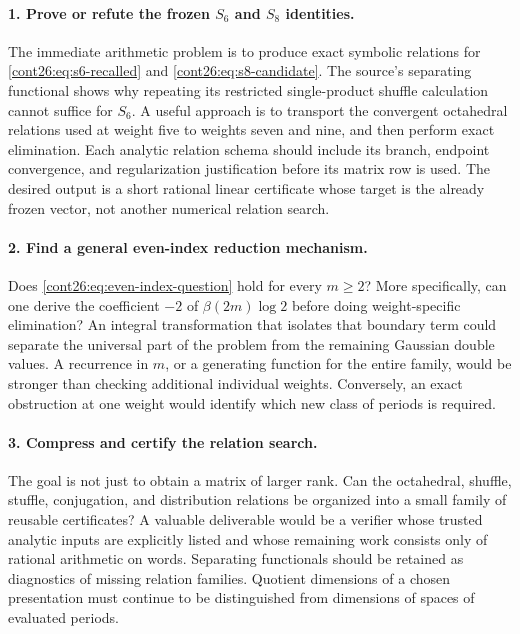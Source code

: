 \documentclass[11pt,letterpaper]{article}
\numberwithin{equation}{section}
\theoremstyle{plain}
\theoremstyle{definition}
\theoremstyle{remark}
\begin{document}
\paragraph{1. Prove or refute the frozen $S_6$ and $S_8$ identities.}
The immediate arithmetic problem is to produce exact symbolic
relations for \eqref{cont26:eq:s6-recalled} and \eqref{cont26:eq:s8-candidate}.
The source's separating functional shows why repeating its
restricted single-product shuffle calculation cannot suffice for
$S_6$. A useful approach is to transport the convergent octahedral
relations used at weight five to weights seven and nine, and then
perform exact elimination. Each analytic relation schema should
include its branch, endpoint convergence, and regularization
justification before its matrix row is used. The desired output is a
short rational linear certificate whose target is the already frozen
vector, not another numerical relation search.

\paragraph{2. Find a general even-index reduction mechanism.}
Does \eqref{cont26:eq:even-index-question} hold for every $m\ge2$?
More specifically, can one derive the coefficient $-2$ of
$\beta(2m)\log2$ before doing weight-specific elimination?
An integral transformation that isolates that boundary term could
separate the universal part of the problem from the remaining
Gaussian double values. A recurrence in $m$, or a generating
function for the entire family, would be stronger than checking
additional individual weights. Conversely, an exact obstruction at
one weight would identify which new class of periods is required.

\paragraph{3. Compress and certify the relation search.}
The goal is not just to obtain a matrix of larger rank. Can the
octahedral, shuffle, stuffle, conjugation, and distribution relations
be organized into a small family of reusable certificates?
A valuable deliverable would be a verifier whose trusted analytic
inputs are explicitly listed and whose remaining work consists only
of rational arithmetic on words. Separating functionals should be
retained as diagnostics of missing relation families. Quotient
dimensions of a chosen presentation must continue to be
distinguished from dimensions of spaces of evaluated periods.
\end{document}
